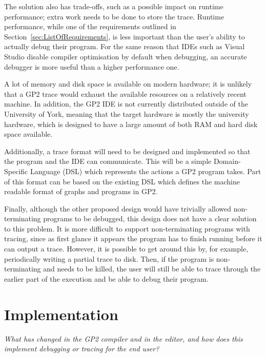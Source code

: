 \documentclass[authoryearcitations]{UoYCSproject}
\begin{document}
The solution also has trade-offs, such as a possible impact on runtime
performance; extra work needs to be done to store the trace. Runtime performance,
while one of the requirements outlined in Section~\ref{sec:ListOfRequirements},
is less important than the user's ability to actually debug their program. For
the same reason that IDEs such as Visual Studio disable compiler optimisation
by default when debugging, an accurate debugger is more useful than a higher
performance one.

A lot of memory and disk space is available on modern hardware; it is unlikely
that a GP2 trace would exhaust the available resources on a relatively recent
machine. In addition, the GP2 IDE is not currently distributed outside of the
University of York, meaning that the target hardware is mostly the university
hardware, which is designed to have a large amount of both RAM and hard disk
space available.

Additionally, a trace format will need to be designed and implemented so that
the program and the IDE can communicate. This will be a simple Domain-Specific
Language (DSL) which represents the actions a GP2 program takes. Part of this
format can be based on the existing DSL which defines the machine readable 
format of graphs and programs in GP2.

Finally, although the other proposed design would have trivially allowed
non-terminating programs to be debugged, this design does not have a clear
solution to this problem. It is more difficult to support non-terminating
programs with tracing, since as first glance it appears the program has to
finish running before it can output a trace. However, it is possible to get
around this by, for example, periodically writing a partial trace to disk. Then,
if the program is non-terminating and needs to be killed, the user will still
be able to trace through the earlier part of the execution and be able to debug
their program.

\clearpage


\chapter{Implementation}
\label{cha:Implementation}

\emph{What has changed in the GP2 compiler and in the editor, and how does this
implement debugging or tracing for the end user?}
\end{document}
